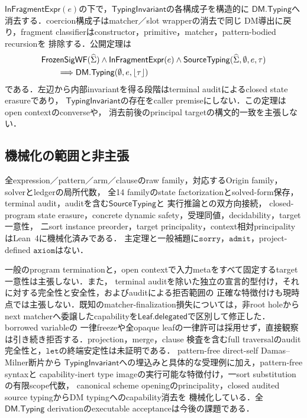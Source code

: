 $\mathsf{InFragmentExpr}(e)$の下で，$\mathsf{TypingInvariant}$の各構成子を構造的に
$\mathsf{DM.Typing}$へ消去する．coercion構成子はmatcher／slot wrapperの消去で同じ
DM導出に戻り，fragment classifierはconstructor，primitive，matcher，pattern-bodied recursionを
排除する．公開定理は
\[
\begin{aligned}
&\mathsf{FrozenSigWF}(\widehat{\Sigma})\land\mathsf{InFragmentExpr}(e)\land
  \mathsf{SourceTyping}(\widehat{\Sigma},\emptyset,e,\tau)\\
&\qquad\Longrightarrow
  \mathsf{DM.Typing}(\emptyset,e,\lfloor\tau\rfloor)
\end{aligned}
\]
である．左辺から内部invariantを得る段階はterminal auditによるclosed state erasureであり，
$\mathsf{TypingInvariant}$の存在をcaller premiseにしない．この定理はopen contextのconverseや，
消去前後のprincipal targetの構文的一致を主張しない．

\subsection{機械化の範囲と非主張}

全expression／pattern／arm／clauseのraw family，対応するOrigin family，solverとledgerの局所代数，
全14 familyのstate factorizationとsolved-form保存，terminal audit，auditを含む$\mathsf{SourceTyping}$と
実行推論との双方向接続，
closed-program state erasure，concrete dynamic safety，受理同値，decidability，target一意性，
二sort instance preorder，target principality，context相対principalityはLean~4に機械化済みである．
主定理と一般補題に$\mathtt{sorry}$，$\mathtt{admit}$，project-defined
$\mathtt{axiom}$はない．

一般のprogram terminationと，open contextで入力metaをすべて固定するtarget一意性は主張しない．また，
terminal auditを除いた独立の宣言的型付け，それに対する完全性と安全性，およびauditによる拒否範囲の
正確な特徴付けも現時点では主張しない．既知のmatcher-finalization損失については，非root holeから
next matcherへ委譲したcapabilityを$\mathsf{Leaf.delegated}$で区別して修正した．borrowed variableの
一律freezeや全opaque leafの一律許可は採用せず，直接観察は引き続き拒否する．projection，merge，clause
検査を含むfull traversalのaudit完全性と，$\mathtt{let}$の終端安定性は未証明である．
pattern-free direct-self Damas--Milner断片から
$\mathsf{TypingInvariant}$への埋込みと具体的な受理例に加え，pattern-free syntaxと
capability-inert type imageの実行可能な特徴付け，一sort substitutionの有限scope代数，
canonical scheme openingのprincipality，closed audited source typingからDM typingへのcapability消去を
機械化している．全$\mathsf{DM.Typing}$ derivationのexecutable acceptanceは今後の課題である．
